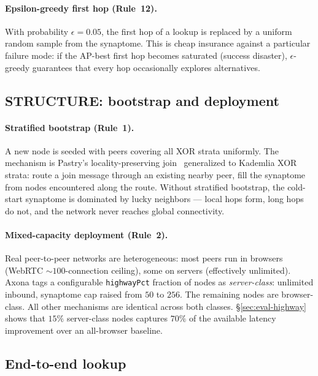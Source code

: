\documentclass[conference]{IEEEtran}
\newcommand{\axona}{Axona\xspace}
\begin{document}
\paragraph{Epsilon-greedy first hop (Rule~12).}
With probability $\epsilon = 0.05$, the first hop of a lookup is
replaced by a uniform random sample from the synaptome. This is cheap
insurance against a particular failure mode: if the AP-best first hop
becomes saturated (success disaster), $\epsilon$-greedy guarantees that
every hop occasionally explores alternatives.

\subsection{STRUCTURE: bootstrap and deployment}
\label{sec:nh1-structure}

\paragraph{Stratified bootstrap (Rule~1).}
A new node is seeded with peers covering all XOR strata uniformly. The
mechanism is Pastry's locality-preserving join~\cite{rowstron2001pastry}
generalized to Kademlia XOR strata: route a join message through an
existing nearby peer, fill the synaptome from nodes encountered along
the route. Without stratified bootstrap, the cold-start synaptome is
dominated by lucky neighbors --- local hops form, long hops do not, and
the network never reaches global connectivity.

\paragraph{Mixed-capacity deployment (Rule~2).}
Real peer-to-peer networks are heterogeneous: most peers run in browsers
(WebRTC $\sim\!100$-connection ceiling), some on servers (effectively
unlimited). \axona tags a configurable \texttt{highwayPct} fraction of
nodes as \emph{server-class}: unlimited inbound, synaptome cap raised
from $50$ to $256$. The remaining nodes are browser-class. All other
mechanisms are identical across both classes. \S\ref{sec:eval-highway}
shows that $15\%$ server-class nodes captures $70\%$ of the available
latency improvement over an all-browser baseline.

\subsection{End-to-end lookup}
\label{sec:nh1-tick}
\end{document}
